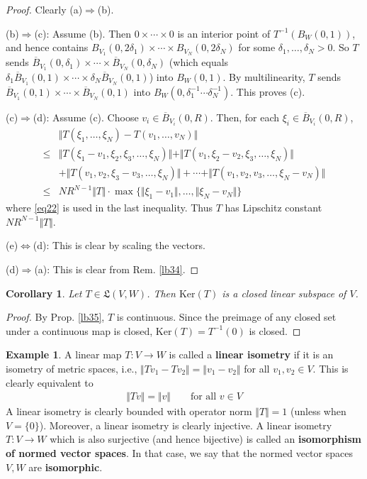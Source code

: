 \documentclass[12pt,b5paper,notitlepage]{article}
\theoremstyle{definition}
\newtheorem{eg}[df]{Example}
\theoremstyle{plain}
\newtheorem{co}[df]{Corollary}
\newcommand{\fk}{\mathfrak}
\newcommand{\ovl}{\overline}
\newcommand{\Ker}{\mathrm{Ker}}
\numberwithin{equation}{section}
\begin{document}
\begin{proof}
Clearly (a)$\Rightarrow$(b).

(b)$\Rightarrow$(c): Assume (b). Then $0\times\cdots\times 0$ is an interior point of $T^{-1}(B_W(0,1))$, and hence contains $B_{V_1}(0,2\delta_1)\times\cdots\times B_{V_N}(0,2\delta_N)$ for some $\delta_1,\dots,\delta_N>0$. So $T$ sends $\ovl B_{V_1}(0,\delta_1)\times\cdots\times\ovl B_{V_N}(0,\delta_N)$ (which equals $\delta_1\ovl B_{V_1}(0,1)\times\cdots\times\delta_N\ovl B_{V_N}(0,1)$) into $B_W(0,1)$. By multilinearity, $T$ sends $\ovl B_{V_1}(0,1)\times\cdots\times\ovl B_{V_N}(0,1)$ into $B_W(0,\delta_1^{-1}\cdots\delta_N^{-1})$. This proves (c). 

(c)$\Rightarrow$(d): Assume (c). Choose $v_i\in \ovl B_{V_i}(0,R)$. Then, for each $\xi_i\in \ovl B_{V_i}(0,R)$,
\begin{align*}
&\Vert T(\xi_1,\dots,\xi_N)-T(v_1,\dots,v_N)\Vert\\
\leq&\Vert T(\xi_1-v_1,\xi_2,\xi_3,\dots,\xi_N)\Vert+\Vert T(v_1,\xi_2-v_2,\xi_3,\dots,\xi_N)\Vert\\
&+\Vert T(v_1,v_2,\xi_3-v_3,\dots,\xi_N)\Vert+\cdots+\Vert T(v_1,v_2,v_3,\dots,\xi_N-v_N)\Vert\\
\leq&NR^{N-1}\Vert T\Vert\cdot \max\{\Vert \xi_1-v_1\Vert,\dots,\Vert \xi_N-v_N\Vert\}
\end{align*}
where \eqref{eq22} is used in the last inequality. Thus $T$ has Lipschitz constant $NR^{N-1}\Vert T\Vert$.

(e)$\Leftrightarrow$(d): This is clear by scaling the vectors.

(d)$\Rightarrow$(a): This is clear from Rem. \ref{lb34}.
\end{proof}


\begin{co}\label{lb147}
Let $T\in\fk L(V,W)$. Then $\Ker(T)$ is a closed linear subspace of $V$.
\end{co}

\begin{proof}
By Prop. \ref{lb35}, $T$ is continuous. Since the preimage of any closed set under a continuous map is closed, $\Ker(T)=T^{-1}(0)$ is closed.
\end{proof}



\begin{eg}
A linear map $T:V\rightarrow W$ is called a \textbf{linear isometry} if it is an isometry of metric spaces, i.e., $\Vert Tv_1-Tv_2\Vert=\Vert v_1-v_2\Vert$ for all $v_1,v_2\in V$. This is clearly equivalent to
\begin{align*}
\Vert Tv\Vert=\Vert v\Vert\qquad\text{for all }v\in V
\end{align*}
A linear isometry is clearly bounded with operator norm $\Vert T\Vert=1$ (unless when $V=\{0\}$). Moreover, a linear isometry is clearly injective. A linear isometry $T:V\rightarrow W$ which is also surjective (and hence bijective) is called an \textbf{isomorphism of normed vector spaces}. In that case, we say that the normed vector spaces $V,W$ are \textbf{isomorphic}. 
\end{eg}
\end{document}
